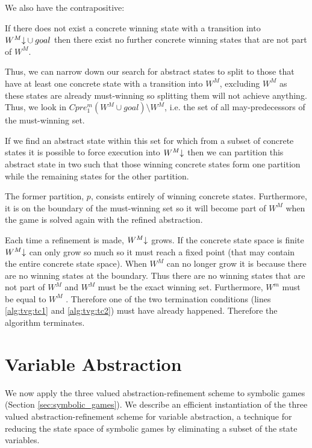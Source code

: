 We also have the contrapositive:

\begin{thm}
If there does not exist a concrete winning state with a transition into $W^M\mathord{\downarrow} \cup goal$ then there exist no further concrete winning states that are not part of $W^M$. 
\end{thm}

Thus, we can narrow down our search for abstract states to split to those that have at least one concrete state with a transition into $W^M$, excluding $W^M$ as these states are already must-winning so splitting them will not achieve anything. Thus, we look in $Cpre_1^m(W^M \cup goal)\setminus W^M$, i.e. the set of all may-predecessors of the must-winning set. 

If we find an abstract state within this set for which from a subset of concrete states it is possible to force execution into $W^M\mathord{\downarrow}$ then we can partition this abstract state in two such that those winning concrete states form one partition while the remaining states for the other partition.

The former partition, $p$, consists entirely of winning concrete states. Furthermore, it is on the boundary of the must-winning set so it will become part of $W^M$ when the game is solved again with the refined abstraction.

Each time a refinement is made, $W^M\mathord{\downarrow}$ grows. If the concrete state space is finite $W^M\mathord{\downarrow}$ can only grow so much so it must reach a fixed point (that may contain the entire concrete state space). When $W^M$ can no longer grow it is because there are no winning states at the boundary. Thus there are no winning states that are not part of $W^M$ and $W^M$ must be the exact winning set. Furthermore, $W^m$ must be equal to $W^M$ . Therefore one of the two termination conditions (lines \ref{alg:tvg:tc1} and \ref{alg:tvg:tc2}) must have already happened. Therefore the algorithm terminates.

\section{Variable Abstraction}

We now apply the three valued abstraction-refinement scheme to symbolic games (Section \ref{sec:symbolic_games}). We describe an efficient instantiation of the three valued abstraction-refinement scheme for variable abstraction, a technique for reducing the state space of symbolic games by eliminating a subset of the state variables.

